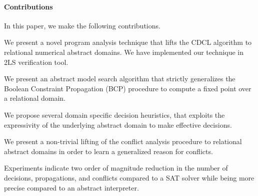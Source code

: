 \paragraph{Contributions}
In this paper, we make the following contributions.
\begin{compactenum}
\item We present a novel program analysis technique that 
lifts the CDCL algorithm to relational numerical abstract domains.   
We have implemented our technique in 2LS verification tool.  

\item We present an abstract model search algorithm that strictly 
generalizes the Boolean Constraint Propagation (BCP) procedure to
compute a fixed point over a relational domain.  

\item We propose several domain specific decision heuristics, that 
exploits the expressivity of the underlying abstract domain to make 
effective decisions. 

\item We present a non-trivial lifting of the conflict analysis procedure 
to relational abstract domains in order to learn a generalized reason 
for conflicts.  
 
\item  Experiments indicate two order of magnitude reduction 
in the number of decisions, propagations, and conflicts compared 
to a SAT solver while being more precise compared to an abstract interpreter.  
\end{compactenum}
